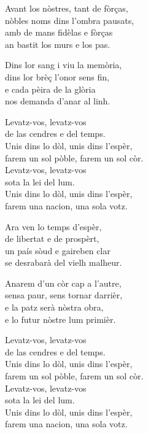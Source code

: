 \begin{lyrics}
Avant los nòstres, tant de fòrças,\\
nòbles noms dins l’ombra pausats,\\
amb de mans fidèlas e fòrças\\
an bastit los murs e los pas.

Dins lor sang i viu la memòria,\\
dins lor brèç l’onor sens fin,\\
e cada pèira de la glòria\\
nos demanda d’anar al linh.

Levatz-vos, levatz-vos\\
de las cendres e del temps.\\
Unis dins lo dòl, unis dins l’espèr,\\
farem un sol pòble, farem un sol còr.\\
Levatz-vos, levatz-vos\\
sota la lei del lum.\\
Unis dins lo dòl, unis dins l’espèr,\\
farem una nacion, una sola votz.

Ara ven lo temps d’espèr,\\
de libertat e de prospèrt,\\
un país sòud e gaireben clar\\
se desrabarà del vielh malheur.

Anarem d’un còr cap a l’autre,\\
sensa paur, sens tornar darrièr,\\
e la patz serà nòstra obra,\\
e lo futur nòstre lum primièr.

Levatz-vos, levatz-vos\\
de las cendres e del temps.\\
Unis dins lo dòl, unis dins l’espèr,\\
farem un sol pòble, farem un sol còr.\\
Levatz-vos, levatz-vos\\
sota la lei del lum.\\
Unis dins lo dòl, unis dins l’espèr,\\
farem una nacion, una sola votz.

\end{lyrics}

